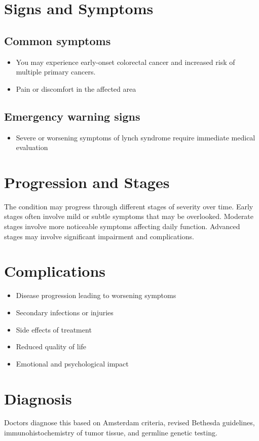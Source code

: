 \section{Signs and Symptoms}

\subsection{Common symptoms}
\begin{itemize}[noitemsep]
  \item You may experience early-onset colorectal cancer and increased risk of multiple primary cancers.

  \item Pain or discomfort in the affected area
  \end{itemize}

\subsection{Emergency warning signs}
\begin{itemize}[noitemsep]
  \item Severe or worsening symptoms of lynch syndrome require immediate medical evaluation
\end{itemize}
\section{Progression and Stages}
The condition may progress through different stages of severity over time. Early stages often involve mild or subtle symptoms that may be overlooked. Moderate stages involve more noticeable symptoms affecting daily function. Advanced stages may involve significant impairment and complications.
\section{Complications}
\begin{itemize}[noitemsep]
  \item Disease progression leading to worsening symptoms
  \item Secondary infections or injuries
  \item Side effects of treatment
  \item Reduced quality of life
  \item Emotional and psychological impact
\end{itemize}
\section{Diagnosis}
Doctors diagnose this based on Amsterdam criteria, revised Bethesda guidelines, immunohistochemistry of tumor tissue, and germline genetic testing.

